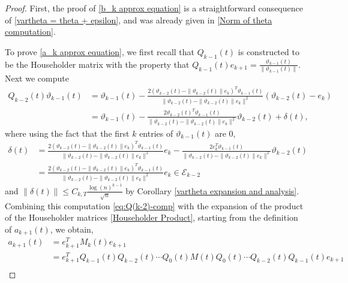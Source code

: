 \documentclass{amsart}
\numberwithin{equation}{section}
\begin{document}
\begin{proof}
    First, the proof of \eqref{b_k approx equation} is a straightforward consequence of \eqref{vartheta = theta + epsilon}, and was already given in \eqref{Norm of theta computation}.

    \par To prove \eqref{a_k approx equation}, we first recall that $Q_{k-1}(t)$ is constructed to be the Householder matrix with the property that $Q_{k-1}(t)e_{k+1}=\frac{\vartheta_{k-1}(t)}{\|\vartheta_{k-1}(t)\|}$. Next we compute
    \begin{equation}\label{eq:Q(k-2)-comp}
        \begin{split}
        Q_{k-2}(t)\vartheta_{k-1}(t)&=\vartheta_{k-1}(t)-\frac{2(\vartheta_{k-2}(t)-\|\vartheta_{k-2}(t)\|e_{k})^T \vartheta_{k-1}(t)}{\|\vartheta_{k-2}(t)-\|\vartheta_{k-2}(t)\|e_{k}\|^2} (\vartheta_{k-2}(t)-e_k)\\
        &=\vartheta_{k-1}(t)-\frac{2\vartheta_{k-2}(t)^T \vartheta_{k-1}(t)}{\|\vartheta_{k-2}(t)-\|\vartheta_{k-2}(t)\|e_{k}\|^2} \vartheta_{k-2}(t)+\delta(t),
        \end{split}
    \end{equation}
     where using the fact that the first $k$ entries of $\vartheta_{k-1}(t)$ are $0$,
     \begin{equation*}
     \begin{split}
         \delta(t)&= \frac{2(\vartheta_{k-2}(t)-\|\vartheta_{k-2}(t)\|e_{k})^T \vartheta_{k-1}(t)}{\|\vartheta_{k-2}(t)-\|\vartheta_{k-2}(t)\|e_{k}\|^2}e_{k}-\frac{2e_k^T \vartheta_{k-1}(t)}{\|\vartheta_{k-2}(t)-\|\vartheta_{k-2}(t)\|e_{k}\|^2}\vartheta_{k-2}(t)\\
         &= \frac{2(\vartheta_{k-2}(t)-\|\vartheta_{k-2}(t)\|e_{k})^T \vartheta_{k-1}(t)}{\|\vartheta_{k-2}(t)-\|\vartheta_{k-2}(t)\|e_{k}\|^2}e_{k} \in \mathcal{E}_{k-2}
     \end{split}
     \end{equation*}
     and $\|\delta(t)\| \leq C_{k,T} \frac{\log(n)^{k-1}}{\sqrt{n}}$ by Corollary \ref{vartheta expansion and analysis}. Combining this computation \eqref{eq:Q(k-2)-comp} with the expansion of the product of the Householder matrices \eqref{Householder Product}, starting from the definition of $a_{k+1}(t)$, we obtain,
    \begin{equation*}
        \begin{split}
            a_{k+1}(t)&=e_{k+1}^T M_k(t) e_{k+1}\\
            &=e_{k+1}^T Q_{k-1}(t)Q_{k-2}(t)\cdots Q_0(t)M(t)Q_0(t)\cdots Q_{k-2}(t)Q_{k-1}(t)e_{k+1}\\

\end{split}
\end{equation*}
\end{proof}
\end{document}
